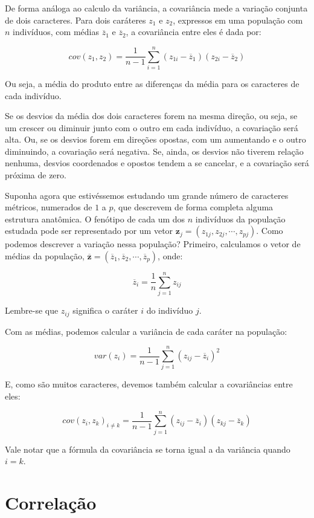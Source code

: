 \documentclass[portuges,]{tufte-handout}
\begin{document}
De forma análoga ao calculo da variância, a covariância mede a variação
conjunta de dois caracteres. Para dois caráteres \(z_1\) e \(z_2\),
expressos em uma população com \(n\) indivíduos, com médias
\(\overline z_1\) e \(\overline z_2\), a covariância entre eles é dada
por:

\[
cov(z_1, z_2) = \frac{1}{n-1} \sum_{i=1}^n (z_{1i} - \overline z_1)(z_{2i} - \overline z_2)
\]

Ou seja, a média do produto entre as diferenças da média para os
caracteres de cada indivíduo.

Se os desvios da média dos dois caracteres forem na mesma direção, ou
seja, se um crescer ou diminuir junto com o outro em cada indivíduo, a
covariação será alta. Ou, se os desvios forem em direções opostas, com
um aumentando e o outro diminuindo, a covariação será negativa. Se,
ainda, os desvios não tiverem relação nenhuma, desvios coordenados e
opostos tendem a se cancelar, e a covariação será próxima de zero.

Suponha agora que estivéssemos estudando um grande número de caracteres
métricos, numerados de \(1\) a \(p\), que descrevem de forma completa
alguma estrutura anatômica. O fenótipo de cada um dos \(n\) indivíduos
da população estudada pode ser representado por um vetor
\(\mathbf{z}_j = (z_{1j}, z_{2j}, \cdots, z_{pj})\). Como podemos
descrever a variação nessa população? Primeiro, calculamos o vetor de
médias da população,
\(\mathbf{\overline z} = (\overline z_1, \overline z_2, \cdots, \overline z_p)\),
onde:

\[
\overline z_i = \frac{1}{n} \sum_{j=1}^n z_{ij}
\]

Lembre-se que \(z_{ij}\) significa o caráter \(i\) do indivíduo \(j\).

Com as médias, podemos calcular a variância de cada caráter na
população:

\[
var(z_i) = \frac{1}{n-1} \sum_{j=1}^n (z_{ij} - \overline z_i)^2
\]

E, como são muitos caracteres, devemos também calcular a covariâncias
entre eles:

\[
cov(z_i, z_k)_{i \ne k} = \frac{1}{n-1} \sum_{j=1}^n (z_{ij} - \overline z_i)(z_{kj} - \overline z_k)
\]

Vale notar que a fórmula da covariância se torna igual a da variância
quando \(i=k\).

\section{Correlação}\label{correlauxe7uxe3o}
\end{document}

